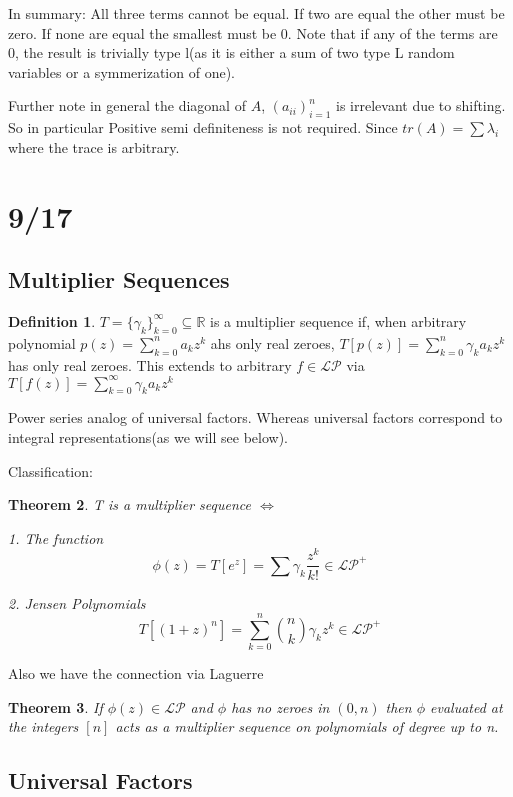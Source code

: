 \documentclass[10pt]{article}
\newcommand{\1}{\textbf{1}}
\newcommand{\R}{\mathbb{R}}
\newcommand{\pP}{\mathcal{P}}
\newcommand{\lL}{\mathcal{L}}
\newtheorem{theorem}{Theorem}
\theoremstyle{remark}
\theoremstyle{definition}
\newtheorem{definition}[theorem]{Definition}
\theoremstyle{prop}
\theoremstyle{Corollary}
\begin{document}
In summary: All three terms cannot be equal. If two are equal the other must be zero. If none are equal the smallest must be 0. Note that if any of the terms are 0, the result is trivially type l(as it is either a sum of two type L random variables or a symmerization of one).

Further note in general the diagonal of $A$, $(a_{ii})_{i=1}^n$ is irrelevant due to shifting. So in particular Positive semi definiteness is not required. Since $tr(A) = \sum \lambda_i$ where the trace is arbitrary.

\section{9/17}

\subsection{Multiplier Sequences}

\begin{definition}
	$T = \{\gamma_k\}_{k=0}^{\infty} \subseteq \R$ is a multiplier sequence if, when arbitrary polynomial $p(z) = \sum_{k=0}^n a_k z^k$ ahs only real zeroes, $T[p(z)] = \sum_{k=0}^n \gamma_k a_kz^k$ has only real zeroes. This extends to arbitrary $f \in \lL \pP$ via $T[f(z)] = \sum_{k=0}^{\infty} \gamma_k a_k z^k$
\end{definition}

Power series analog of universal factors. Whereas universal factors correspond to integral representations(as we will see below).

Classification:

\begin{theorem}
	T is a multiplier sequence $\iff$

	1. The function
	\[
		\phi(z) = T[e^z] = \sum \gamma_k \frac{z^k}{k!} \in \lL \pP^+
	\]

	2. Jensen Polynomials 
	\[
		T[(1+z)^n] = \sum_{k=0}^n {n \choose k} \gamma_k z^k \in \lL \pP^+
	\]
\end{theorem}

Also we have the connection via Laguerre

\begin{theorem}
	If $\phi(z) \in \lL\pP$ and $\phi$ has no zeroes in $(0,n)$ then $\phi$ evaluated at the integers $[n]$ acts as a multiplier sequence on polynomials of degree up to n. 
\end{theorem}


\subsection{Universal Factors}
\end{document}
